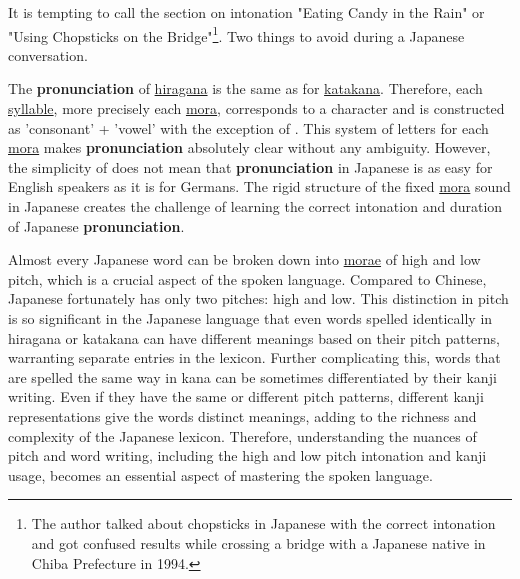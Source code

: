 It is tempting to call the section on intonation "Eating Candy in the Rain" or
"Using Chopsticks on the Bridge"\footnote{The author talked about chopsticks in
Japanese with the correct intonation and got confused results while crossing a
bridge with a Japanese native in Chiba Prefecture in 1994.}. Two things to
avoid during a Japanese conversation.


The \textbf{pronunciation} of \hyperref[sec:Hiragana]{hiragana} is the same as
for \hyperref[sec:Katakana]{katakana}. Therefore, each
\hyperref[sec:Syllable]{syllable}, more precisely each
\hyperref[sec:Mora]{mora}, corresponds to a \hyperref[sec:\jscript]{\jtopic}
character and is constructed as 'consonant' + 'vowel' with the exception of
. This system of letters for each \hyperref[sec:Mora]{mora} makes
\textbf{pronunciation} absolutely clear without any ambiguity. However, the
simplicity of \hyperref[sec:\jscript]{\jtopic} does not mean that
\textbf{pronunciation} in Japanese is as easy for English speakers as it is for
Germans. The rigid structure of the fixed \hyperref[sec:Mora]{mora} sound in
Japanese creates the challenge of learning the correct intonation and duration
of Japanese \textbf{pronunciation}.

Almost every Japanese word can be broken down into \hyperref[sec:Mora]{morae}
of high and low pitch, which is a crucial aspect of the spoken language.
Compared to Chinese, Japanese fortunately has only two pitches: high and low.
This distinction in pitch is so significant in the Japanese language that even
words spelled identically in hiragana or katakana can have different meanings
based on their pitch patterns, warranting separate entries in the lexicon.
Further complicating this, words that are spelled the same way in kana can be
sometimes differentiated by their kanji writing. Even if they have the same or
different pitch patterns, different kanji representations give the words
distinct meanings, adding to the richness and complexity of the Japanese
lexicon. Therefore, understanding the nuances of pitch and word writing,
including the high and low pitch intonation and kanji usage, becomes an
essential aspect of mastering the spoken language.

